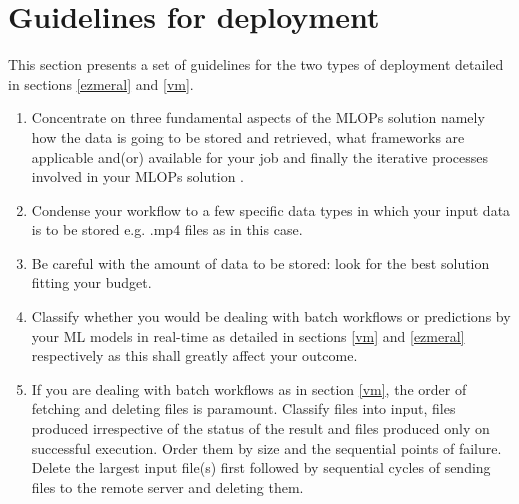 \section{Guidelines for deployment}

This section presents a set of guidelines for the two types of
deployment detailed in sections \ref{ezmeral} and \ref{vm}.

\begin{enumerate}
  \item Concentrate on three fundamental aspects of the MLOPs
    solution namely how the data is going to be stored and retrieved,
    what frameworks are applicable and(or) available for your job and
    finally the iterative processes involved in your MLOPs solution
    \cite{Odegua2020}.

  \item Condense your workflow to a few specific data types in which
    your input data is to be stored e.g. .mp4 files as in this case.

  \item Be careful with the amount of data to be stored: look for the
    best solution fitting your budget.

  \item Classify whether you would be dealing with batch workflows or
    predictions by your ML models in real-time as detailed in
    sections \ref{vm} and \ref{ezmeral} respectively as this shall
    greatly affect your outcome.

  \item If you are dealing with batch workflows as in section
    \ref{vm}, the order of fetching and deleting files is paramount.
    Classify files into input, files produced irrespective of the
    status of the result and files produced only on successful
    execution. Order them by size and the sequential points of
    failure. Delete the largest input file(s) first followed by
    sequential cycles of sending files to the remote server and deleting them.
\end{enumerate}
